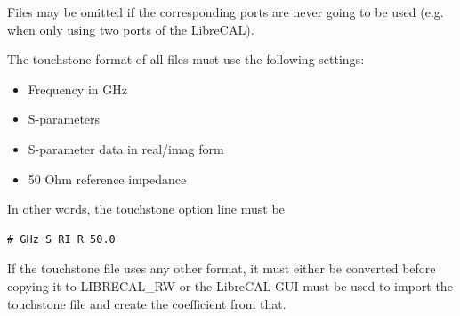 \documentclass[a4paper,11pt]{article}
\newcommand\danger[1][5ex]{%
  \renewcommand\stacktype{L}%
  \scaleto{\stackon[1.3pt]{\color{red}$\triangle$}{\tiny !}}{#1}%
}
\newenvironment{important}[1][]{%
   \begin{mdframed}[%
      backgroundcolor={red!15}, hidealllines=true,
      skipabove=0.7\baselineskip, skipbelow=0.7\baselineskip,
      splitbottomskip=2pt, splittopskip=4pt, #1]%
   \makebox[0pt]{%
      \smash{%
         \hspace*{-45pt}%
         \raisebox{-5pt}{%
            {\danger}%
         }%
      }%
   }%
}{\end{mdframed}}
\newcommand\info[1][5ex]{%
  \renewcommand\stacktype{L}%
  \scaleto{\stackon[1.2pt]{\color{blue}$\bigcirc$}{\raisebox{-1.5pt}{\small i}}}{#1}%
}
\newenvironment{information}[1][]{%
   \begin{mdframed}[%
      backgroundcolor={blue!15}, hidealllines=true,
      skipabove=0.7\baselineskip, skipbelow=0.7\baselineskip,
      splitbottomskip=2pt, splittopskip=4pt, #1]%
   \makebox[0pt]{%
      \smash{%
         \hspace*{-45pt}%
         \raisebox{-5pt}{%
            {\info}%
         }%
      }%
   }%
}{\end{mdframed}}
\newcommand{\dev}{LibreCAL}
\begin{document}
\begin{information}
Files may be omitted if the corresponding ports are never going to be used (e.g. when only using two ports of the \dev{}).
\end{information}

\begin{important}
The touchstone format of all files must use the following settings:
\begin{itemize}
\item Frequency in GHz
\item S-parameters
\item S-parameter data in real/imag form
\item 50 Ohm reference impedance
\end{itemize}
\end{important}
In other words, the touchstone option line must be
\begin{lstlisting}
# GHz S RI R 50.0
\end{lstlisting}
If the touchstone file uses any other format, it must either be converted before copying it to \mbox{LIBRECAL\_R}W or the \dev{}-GUI must be used to import the touchstone file and create the coefficient from that.
\end{document}
